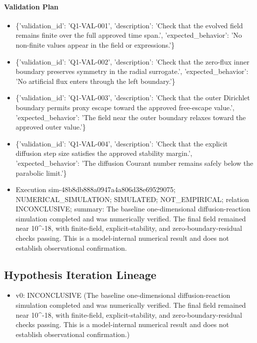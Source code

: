 \documentclass[11pt]{article}
\begin{document}
\paragraph{Validation Plan}
\begin{itemize}\raggedright
\item \{'validation\_\allowbreak{}id': 'Q1-VAL-001', 'description': 'Check that the evolved field remains finite over the full approved time span.', 'expected\_\allowbreak{}behavior': 'No non-finite values appear in the field or expressions.'\}
\item \{'validation\_\allowbreak{}id': 'Q1-VAL-002', 'description': 'Check that the zero-flux inner boundary preserves symmetry in the radial surrogate.', 'expected\_\allowbreak{}behavior': 'No artificial flux enters through the left boundary.'\}
\item \{'validation\_\allowbreak{}id': 'Q1-VAL-003', 'description': 'Check that the outer Dirichlet boundary permits proxy escape toward the approved free-escape value.', 'expected\_\allowbreak{}behavior': 'The field near the outer boundary relaxes toward the approved outer value.'\}
\item \{'validation\_\allowbreak{}id': 'Q1-VAL-004', 'description': 'Check that the explicit diffusion step size satisfies the approved stability margin.', 'expected\_\allowbreak{}behavior': 'The diffusion Courant number remains safely below the parabolic limit.'\}
\end{itemize}

\begin{itemize}
\item Execution sim-48b8db888a0947a4a806d38e69529075; NUMERICAL\_SIMULATION; SIMULATED; NOT\_EMPIRICAL; relation INCONCLUSIVE; summary: The baseline one-dimensional diffusion-reaction simulation completed and was numerically verified. The final field remained near 10\textasciicircum{}-18, with finite-field, explicit-stability, and zero-boundary-residual checks passing. This is a model-internal numerical result and does not establish observational confirmation.
\end{itemize}

\subsection{Hypothesis Iteration Lineage}

\begin{itemize}\raggedright
\item v0: INCONCLUSIVE (The baseline one-dimensional diffusion-reaction simulation completed and was numerically verified. The final field remained near 10\textasciicircum{}-18, with finite-field, explicit-stability, and zero-boundary-residual checks passing. This is a model-internal numerical result and does not establish observational confirmation.)
\end{itemize}
\end{document}
